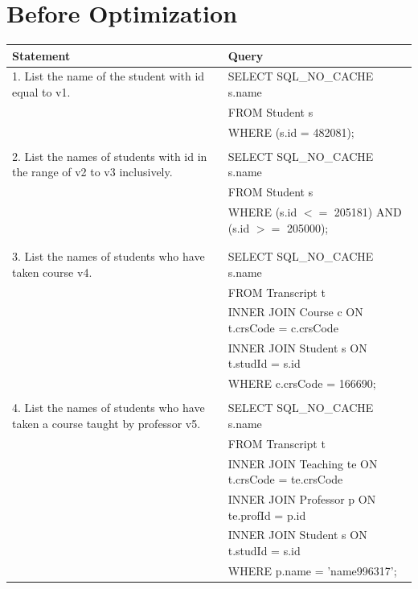 \documentclass[11pt]{report}
\begin{document}
\section*{Before Optimization}
	\begin{flushleft}
		\begin{tabular}{m{15em}|m{27.5em}} 
			\textbf{Statement} & \textbf{Query} \\
			\hline
			\multirow{1}{15em}{1. List the name of the student with id equal to v1.} 
			& SELECT SQL\_NO\_CACHE s.name \\ 
			& FROM Student s \\ 
			& WHERE (s.id = 482081); \\
			&\\ 
			\multirow{1}{15em}{2. List the names of students with id in the range of v2 to v3 
			inclusively.} 
			& SELECT SQL\_NO\_CACHE s.name \\ 
			& FROM Student s \\ 
			& WHERE (s.id $<=$ 205181) AND (s.id $>=$ 205000); \\
			&\\
			&\\ 
			\multirow{1}{15em}{3. List the names of students who have taken course v4.} 
			& SELECT SQL\_NO\_CACHE s.name \\ 
			& FROM Transcript t \\ 
			& INNER JOIN Course c ON t.crsCode = c.crsCode \\
			& INNER JOIN Student s ON t.studId = s.id \\
			& WHERE c.crsCode = 166690; \\
			&\\ 
			\multirow{1}{15em}{4. List the names of students who have taken a course taught by 
			professor v5.} 
			& SELECT SQL\_NO\_CACHE s.name \\ 
			& FROM Transcript t \\ 
			& INNER JOIN Teaching te ON t.crsCode = te.crsCode \\
			& INNER JOIN Professor p ON te.profId = p.id \\
			& INNER JOIN Student s ON t.studId = s.id \\
			& WHERE p.name = 'name996317'; \\
		\end{tabular}
	\end{flushleft}
\end{document}

